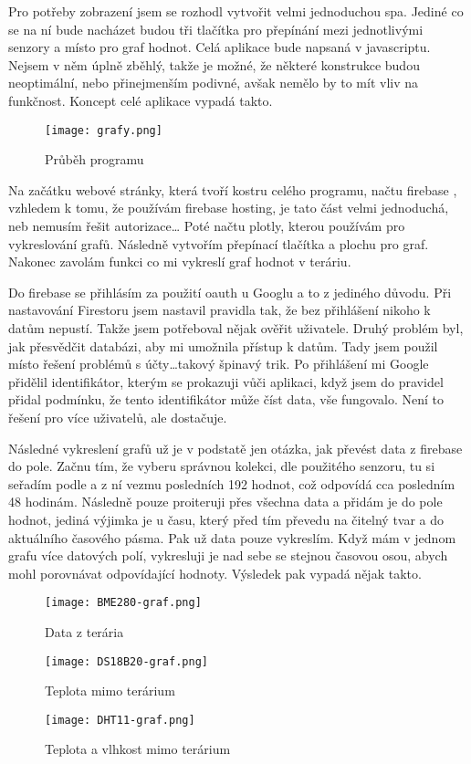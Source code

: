 Pro potřeby zobrazení jsem se rozhodl vytvořit velmi jednoduchou \gls{spa}. Jediné co se na ní bude nacházet budou tři 
tlačítka pro přepínání mezi jednotlivými senzory a místo pro graf hodnot. Celá aplikace bude napsaná v javascriptu. 
Nejsem v něm úplně zběhlý, takže je možné, že některé konstrukce budou neoptimální, nebo přinejmenším podivné, avšak 
nemělo by to mít vliv na funkčnost. Koncept celé aplikace vypadá takto.

\begin{figure}[H]
  \centering
  \texttt{[image: grafy.png]}
  \caption{Průběh programu}
\end{figure}

Na začátku webové stránky, která tvoří kostru celého programu, načtu \gls{firebase} , 
vzhledem k tomu, že používám \gls{firebase} hosting, je tato část velmi jednoduchá, neb nemusím řešit autorizace\ldots 
Poté načtu  \gls{plotly}, kterou používám pro vykreslování grafů. Následně vytvořím 
přepínací tlačítka a plochu pro graf. Nakonec zavolám funkci co mi vykreslí graf hodnot v teráriu.

Do \gls{firebase} se přihlásím za použití \gls{oauth} u Googlu a to z jediného důvodu. Při nastavování Firestoru jsem 
nastavil pravidla tak, že bez přihlášení nikoho k datům nepustí. Takže jsem potřeboval nějak ověřit uživatele. Druhý 
problém byl, jak přesvědčit databázi, aby mi umožnila přístup k datům. Tady jsem použil místo řešení problémů 
s účty\ldots takový špinavý trik. Po přihlášení mi Google přidělil identifikátor, kterým se prokazuji vůči aplikaci, 
když jsem do pravidel přidal podmínku, že tento identifikátor může číst data, vše fungovalo. Není to řešení pro více 
uživatelů, ale dostačuje.

Následné vykreslení grafů už je v podstatě jen otázka, jak převést data z \gls{firebase} do pole. Začnu tím, že vyberu 
správnou kolekci, dle použitého senzoru, tu si seřadím podle  a z ní vezmu posledních 192 
hodnot, což odpovídá cca posledním 48 hodinám. Následně pouze proiteruji přes všechna data a přidám je do pole hodnot, 
jediná výjimka je u času, který před tím převedu na čitelný tvar a do aktuálního časového pásma. Pak už data pouze 
vykreslím. Když mám v jednom grafu více datových polí, vykresluji je nad sebe se stejnou časovou osou, abych mohl 
porovnávat odpovídající hodnoty. Výsledek pak vypadá nějak takto.

\begin{figure}[H]
    \centering
    \texttt{[image: BME280-graf.png]}
    \caption{Data z terária}
\end{figure}
\begin{figure}[H]
    \centering
    \texttt{[image: DS18B20-graf.png]}
    \caption{Teplota mimo terárium}
\end{figure}
\begin{figure}[H]
    \centering
    \texttt{[image: DHT11-graf.png]}
    \caption{Teplota a vlhkost mimo terárium}
\end{figure}
